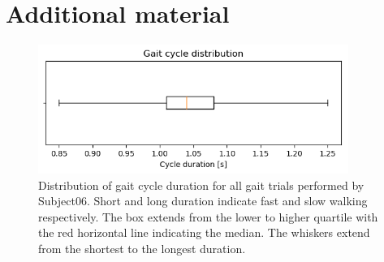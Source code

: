 

\chapter{Additional material}



\begin{figure}
    \centering
    \includegraphics[width=0.9\textwidth]{img/results/20190429_06_gait_cycle_duration_quart.png}
    \caption{Distribution of gait cycle duration for all gait trials performed by Subject06. Short and long duration indicate fast and slow walking respectively. The box extends from the lower to higher quartile with the red horizontal line indicating the median. The whiskers extend from the shortest to the longest duration.}
    \label{fig:subject06-gait-cycle-dist}
\end{figure}

